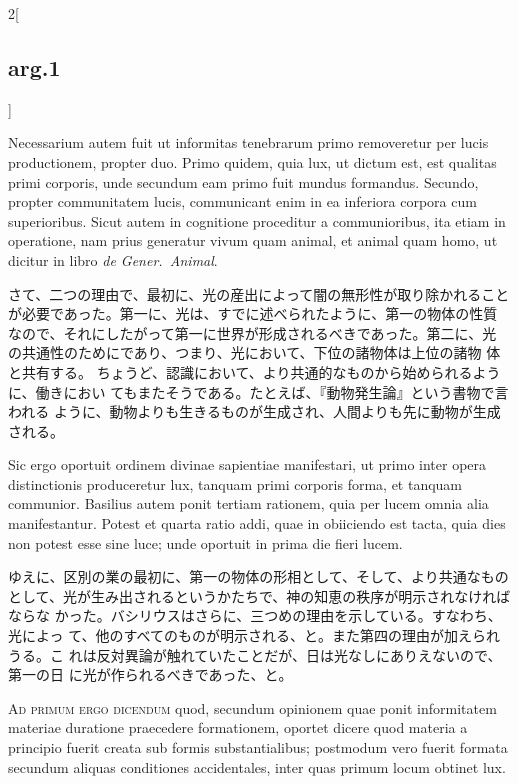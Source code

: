 \documentclass[paper=a4paper,fontsize=10pt,jafontsize=9pt,titlepage]{jlreq}
\begin{document}
\begin{paracol}{2}[\subsection{arg.1}]
\switchcolumn*

Necessarium autem fuit ut informitas tenebrarum primo
removeretur per lucis productionem, propter duo. Primo quidem, quia lux,
ut dictum est, est qualitas primi corporis, unde secundum eam primo fuit
mundus formandus. Secundo, propter communitatem lucis, communicant enim
in ea inferiora corpora cum superioribus. Sicut autem in cognitione
proceditur a communioribus, ita etiam in operatione, nam prius generatur
vivum quam animal, et animal quam homo, ut dicitur in libro {\itshape de
Gener.~Animal}.

\switchcolumn

さて、二つの理由で、最初に、光の産出によって闇の無形性が取り除かれること
 が必要であった。第一に、光は、すでに述べられたように、第一の物体の性質
 なので、それにしたがって第一に世界が形成されるべきであった。第二に、光
 の共通性のためにであり、つまり、光において、下位の諸物体は上位の諸物
 体と共有する。
ちょうど、認識において、より共通的なものから始められるように、働きにおい
 てもまたそうである。たとえば、『動物発生論』という書物で言われる
 ように、動物よりも生きるものが生成され、人間よりも先に動物が生成される。

\switchcolumn*

Sic ergo oportuit ordinem divinae sapientiae
manifestari, ut primo inter opera distinctionis produceretur lux,
tanquam primi corporis forma, et tanquam communior. Basilius autem ponit
tertiam rationem, quia per lucem omnia alia manifestantur. Potest et
quarta ratio addi, quae in obiiciendo est tacta, quia dies non potest
esse sine luce; unde oportuit in prima die fieri lucem.

\switchcolumn

ゆえに、区別の業の最初に、第一の物体の形相として、そして、より共通なもの
 として、光が生み出されるというかたちで、神の知恵の秩序が明示されなければならな
 かった。バシリウスはさらに、三つめの理由を示している。すなわち、光によっ
 て、他のすべてのものが明示される、と。また第四の理由が加えられうる。こ
 れは反対異論が触れていたことだが、日は光なしにありえないので、第一の日
 に光が作られるべきであった、と。

\switchcolumn*[\subsection{ad.1}]

{\scshape Ad primum ergo dicendum} quod, secundum
opinionem quae ponit informitatem materiae duratione praecedere
formationem, oportet dicere quod materia a principio fuerit creata sub
formis substantialibus; postmodum vero fuerit formata secundum aliquas
conditiones accidentales, inter quas primum locum obtinet lux.


\end{paracol}
\end{document}
